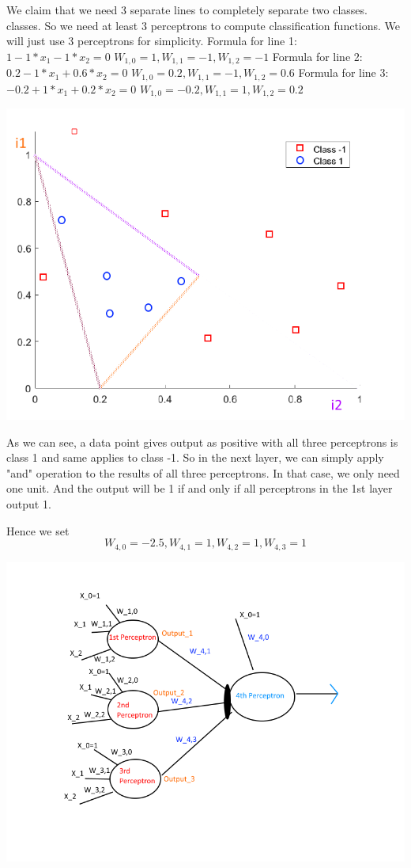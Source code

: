 \documentclass[12pt, letterpaper]{article}
\begin{document}
	We claim that we need 3 separate lines to completely separate two classes. classes. So we need at least 3 perceptrons
	to compute classification functions. We will just use 3 perceptrons for simplicity.\newline
	\newline
	Formula for line 1:\newline
	$1-1*x_{1}-1*x_{2}=0$\newline
	$W_{1,0}=1,W_{1,1}=-1,W_{1,2}=-1$\newline
	Formula for line 2:\newline
	$0.2-1*x_{1}+0.6*x_{2}=0$\newline
	$W_{1,0}=0.2,W_{1,1}=-1,W_{1,2}=0.6$\newline
	Formula for line 3:\newline
	$-0.2+1*x_{1}+0.2*x_{2}=0$\newline
	$W_{1,0}=-0.2,W_{1,1}=1,W_{1,2}=0.2$\newline
	
	\includegraphics[scale=0.6]{"problem-5b-1"}
	
	As we can see, a data point gives output as positive with all three perceptrons is class 1 and same applies to class -1.
	So in the next layer, we can simply apply "and" operation to the results of all three perceptrons. In that case, we only need one unit. And the output will be 1 if and only if all perceptrons in the 1st layer output 1.
	
	Hence we set $$W_{4,0}=-2.5,W_{4,1}=1,W_{4,2}=1,W_{4,3}=1$$\newline
	
	\includegraphics[scale=0.6]{"problem-5b-2"}
	
	
	
	
\end{document}
